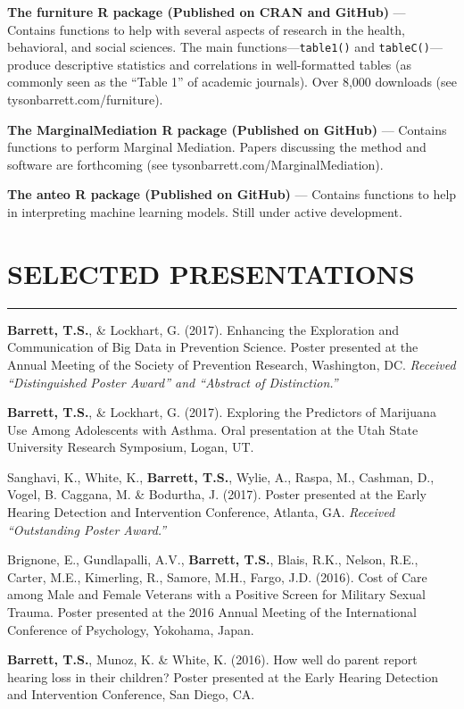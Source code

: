 \documentclass[]{DissertateUSU}
\begin{document}
\textbf{The furniture R package (Published on CRAN and GitHub)} ---
Contains functions to help with several aspects of research in the
health, behavioral, and social sciences. The main
functions---\texttt{table1()} and \texttt{tableC()}---produce
descriptive statistics and correlations in well-formatted tables (as
commonly seen as the ``Table 1'' of academic journals). Over 8,000
downloads (see tysonbarrett.com/furniture).

\textbf{The MarginalMediation R package (Published on GitHub)} ---
Contains functions to perform Marginal Mediation. Papers discussing the
method and software are forthcoming (see
tysonbarrett.com/MarginalMediation).

\textbf{The anteo R package (Published on GitHub)} --- Contains
functions to help in interpreting machine learning models. Still under
active development.

\vspace{20pt} \tocless\section{SELECTED PRESENTATIONS} \vspace{-10pt}
\hrule

\textbf{Barrett, T.S.}, \& Lockhart, G. (2017). Enhancing the
Exploration and Communication of Big Data in Prevention Science. Poster
presented at the Annual Meeting of the Society of Prevention Research,
Washington, DC. \emph{Received ``Distinguished Poster Award'' and
``Abstract of Distinction.''}

\textbf{Barrett, T.S.}, \& Lockhart, G. (2017). Exploring the Predictors
of Marijuana Use Among Adolescents with Asthma. Oral presentation at the
Utah State University Research Symposium, Logan, UT.

Sanghavi, K., White, K., \textbf{Barrett, T.S.}, Wylie, A., Raspa, M.,
Cashman, D., Vogel, B. Caggana, M. \& Bodurtha, J. (2017). Poster
presented at the Early Hearing Detection and Intervention Conference,
Atlanta, GA. \emph{Received ``Outstanding Poster Award.''}

Brignone, E., Gundlapalli, A.V., \textbf{Barrett, T.S.}, Blais, R.K.,
Nelson, R.E., Carter, M.E., Kimerling, R., Samore, M.H., Fargo, J.D.
(2016). Cost of Care among Male and Female Veterans with a Positive
Screen for Military Sexual Trauma. Poster presented at the 2016 Annual
Meeting of the International Conference of Psychology, Yokohama, Japan.

\textbf{Barrett, T.S.}, Munoz, K. \& White, K. (2016). How well do
parent report hearing loss in their children? Poster presented at the
Early Hearing Detection and Intervention Conference, San Diego, CA.
\end{document}

